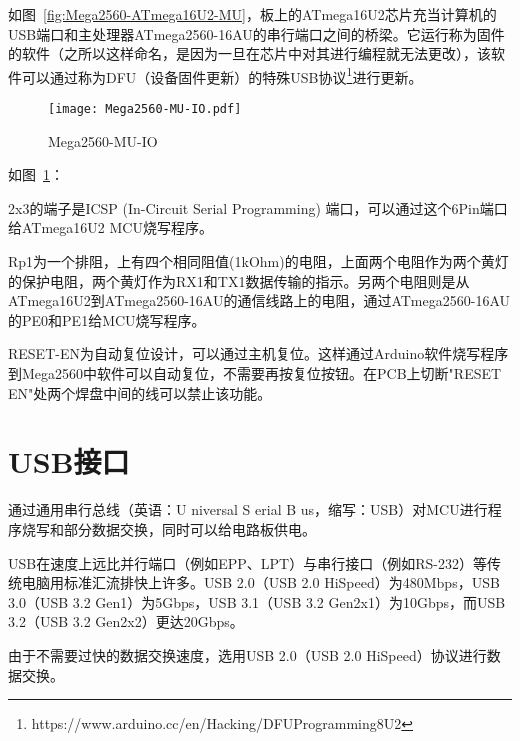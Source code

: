 如图~\ref{fig:Mega2560-ATmega16U2-MU}，板上的ATmega16U2芯片充当计算机的USB端口和主处理器ATmega2560-16AU的串行端口之间的桥梁。它运行称为固件的软件（之所以这样命名，是因为一旦在芯片中对其进行编程就无法更改），该软件可以通过称为DFU（设备固件更新）的特殊USB协议\footnote{https://www.arduino.cc/en/Hacking/DFUProgramming8U2}进行更新。

\begin{figure}[htbp]
    \centering
    \texttt{[image: Mega2560-MU-IO.pdf]}
    \caption{Mega2560-MU-IO}
    \label{fig:Mega2560-MU-IO}
\end{figure}

如图~\ref{fig:Mega2560-MU-IO}：

2x3的端子是ICSP (In-Circuit Serial Programming) 端口，可以通过这个6Pin端口给ATmega16U2 MCU烧写程序。

Rp1为一个排阻，上有四个相同阻值(1kOhm)的电阻，上面两个电阻作为两个黄灯的保护电阻，两个黄灯作为RX1和TX1数据传输的指示。另两个电阻则是从ATmega16U2到ATmega2560-16AU的通信线路上的电阻，通过ATmega2560-16AU的PE0和PE1给MCU烧写程序。

RESET-EN为自动复位设计，可以通过主机复位。这样通过Arduino软件烧写程序到Mega2560中软件可以自动复位，不需要再按复位按钮。在PCB上切断"RESET EN"处两个焊盘中间的线可以禁止该功能。

\section{USB接口}

通过通用串行总线（英语：U niversal S erial B us，缩写：USB）对MCU进行程序烧写和部分数据交换，同时可以给电路板供电。

USB在速度上远比并行端口（例如EPP、LPT）与串行接口（例如RS-232）等传统电脑用标准汇流排快上许多。USB 2.0（USB 2.0 HiSpeed）为480Mbps，USB 3.0（USB 3.2 Gen1）为5Gbps，USB 3.1（USB 3.2 Gen2x1）为10Gbps，而USB 3.2（USB 3.2 Gen2x2）更达20Gbps。

由于不需要过快的数据交换速度，选用USB 2.0（USB 2.0 HiSpeed）协议进行数据交换。

